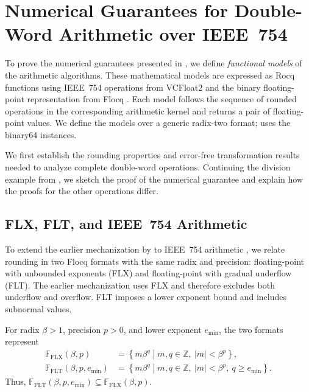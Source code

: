 \section{Numerical Guarantees for Double-Word Arithmetic over IEEE~754}
\label{sec:numerics}

To prove the numerical guarantees presented in ,
we define \emph{functional models} of the arithmetic algorithms.
These mathematical models are expressed as Rocq functions using
IEEE~754 operations from VCFloat2 \citep{AppelKellison2024} and the
binary floating-point representation from Flocq \citep{Boldo2011}.
Each model follows the sequence of rounded operations in the
corresponding arithmetic kernel and returns a pair of floating-point
values. We define the models
over a generic radix-two format; \FenceDD{} uses the binary64
instances.

We first establish the rounding properties and error-free
transformation results needed to analyze complete double-word
operations. Continuing the division example from ,
we sketch the proof of the numerical guarantee and explain how
the proofs for the other operations differ.

\subsection{FLX, FLT, and IEEE~754 Arithmetic}
\label{sec:flx-to-ieee}

To extend the earlier mechanization by \citeauthor{Rideau2022} to
IEEE~754 arithmetic \citep{IEEE754-2019}, we relate rounding in two
Flocq formats with the same radix and precision: floating-point with
unbounded exponents (FLX) and floating-point with gradual underflow
(FLT). The earlier mechanization uses FLX and therefore excludes
both underflow and overflow. FLT imposes a lower exponent bound and
includes subnormal values.

For radix $\beta>1$, precision $p>0$, and lower exponent $e_{\min}$, the two
formats represent
\[
\begin{aligned}
  \mathbb{F}_{\mathrm{FLX}}(\beta,p)
    &=
    \left\{m\beta^q \mathrel{}\middle|\mathrel{}
      m,q\in\mathbb{Z},\ |m|<\beta^p\right\},\\
  \mathbb{F}_{\mathrm{FLT}}(\beta,p,e_{\min})
    &=
    \left\{m\beta^q \mathrel{}\middle|\mathrel{}
      m,q\in\mathbb{Z},\ |m|<\beta^p,\ q\geq e_{\min}\right\}.
\end{aligned}
\]
Thus,
$\mathbb{F}_{\mathrm{FLT}}(\beta,p,e_{\min})
 \subseteq\mathbb{F}_{\mathrm{FLX}}(\beta,p)$.

